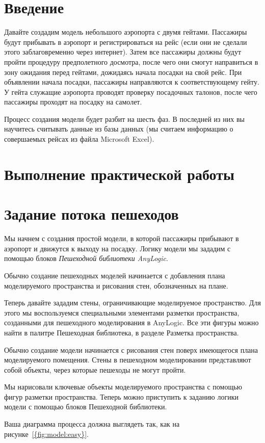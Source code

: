 \graphicspath{{./fifth/img/}} %

\section*{\LARGE Введение}
Давайте создадим модель небольшого аэропорта с двумя гейтами. Пассажиры
будут прибывать в аэропорт и регистрироваться на рейс (если они не сделали
этого заблаговременно через интернет). Затем все пассажиры должны будут
пройти процедуру предполетного досмотра, после чего они смогут направиться
в зону ожидания перед гейтами, дожидаясь начала посадки на свой рейс. При
объявлении начала посадки, пассажиры направляются к соответствующему
гейту. У гейта служащие аэропорта проводят проверку посадочных талонов,
после чего пассажиры проходят на посадку на самолет.\par
Процесс создания модели будет разбит на шесть фаз. В последней из них вы
научитесь считывать данные из базы данных (мы считаем информацию о
совершаемых рейсах из файла Microsoft Excel).

\clearpage

\section*{\LARGE Выполнение практической работы}

\section{Задание потока пешеходов}
Мы начнем с создания простой модели, в которой пассажиры прибывают в
аэропорт и движутся к выходу на посадку. Логику модели мы зададим с
помощью блоков \textit{Пешеходной библиотеки AnyLogic}.\par
Обычно создание пешеходных моделей начинается с добавления плана
моделируемого пространства и рисования стен, обозначенных на плане.\par
Теперь давайте зададим стены, ограничивающие моделируемое пространство.
Для этого мы воспользуемся специальными элементами разметки пространства,
созданными для пешеходного моделирования в AnyLogic. Все эти фигуры можно
найти в палитре Пешеходная библиотека, в разделе Разметка пространства.\par
Обычно создание модели начинается с рисования стен поверх имеющегося
плана моделируемого помещения. Стены в пешеходном моделировании
представляют собой объекты, через которые пешеходы не могут пройти.\par
Мы нарисовали ключевые объекты моделируемого пространства с помощью
фигур разметки пространства. Теперь можно приступить к заданию логики
модели с помощью блоков Пешеходной библиотеки.\par
Ваша диаграмма процесса должна выглядеть так, как
на рисунке~\ref{{fig:model:easy}}.

